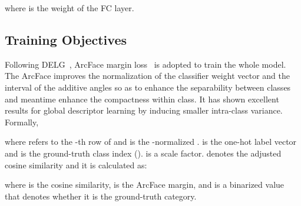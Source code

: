 \documentclass[letterpaper]{article} \usepackage{aaai22}  \usepackage{times}  \usepackage{helvet}  \usepackage{courier}  \usepackage[hyphens]{url}  \usepackage{graphicx} \urlstyle{rm} \def\UrlFont{\rm}  \usepackage{natbib}  \usepackage{caption} \DeclareCaptionStyle{ruled}{labelfont=normalfont,labelsep=colon,strut=off} \frenchspacing  \setlength{\pdfpagewidth}{8.5in}  \setlength{\pdfpageheight}{11in}  \usepackage{algorithm}
\begin{document}
where  is the weight of the FC layer.

\subsection{Training Objectives}
Following DELG~\cite{cao2020unifying}, ArcFace margin loss~\cite{Deng_2019_CVPR} is adopted to train the whole model.
The ArcFace improves the normalization of the classifier weight vector  and the interval of the additive angles  so as to enhance the separability between classes and meantime enhance the compactness within class. 
It has shown excellent results for global descriptor learning by inducing smaller intra-class variance. Formally,

where  refers to the -th row of  and  is the -normalized .  is the one-hot label vector and  is the ground-truth class index ().  is a scale factor. 
 denotes the adjusted cosine similarity and it is calculated as:

where  is the cosine similarity,  is the ArcFace margin, and  is a binarized value that denotes whether it is the ground-truth category.
\end{document}
